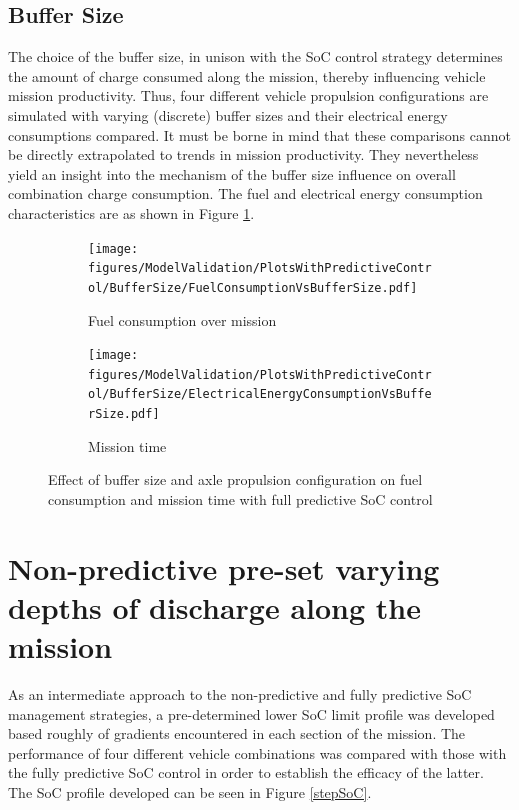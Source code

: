 \documentclass[ExampleMasters.tex]{subfiles}
\begin{document}
\subsection{Buffer Size}
The choice of the buffer size, in unison with the SoC control strategy determines the amount of charge consumed along the mission, thereby influencing vehicle mission productivity. Thus, four different vehicle propulsion configurations are simulated with varying (discrete) buffer sizes and their electrical energy consumptions compared. It must be borne in mind that these comparisons cannot be directly extrapolated to trends in mission productivity. They nevertheless yield an insight into the mechanism of the buffer size influence on overall combination charge consumption. The fuel and electrical energy consumption characteristics are as shown in Figure \ref{fuelElectricalEnergyBufferSizePredictiveSoC}.\\

\begin{figure}[h!]
\begin{subfigure}{.5\textwidth}
	\centering
	\texttt{[image: figures/ModelValidation/PlotsWithPredictiveControl/BufferSize/FuelConsumptionVsBufferSize.pdf]}
	\caption{Fuel consumption over mission}
\end{subfigure}
\begin{subfigure}{.5\textwidth}
	\centering
	\texttt{[image: figures/ModelValidation/PlotsWithPredictiveControl/BufferSize/ElectricalEnergyConsumptionVsBufferSize.pdf]}
	\caption{Mission time}
\end{subfigure}
\caption{Effect of buffer size and axle propulsion configuration on fuel consumption and mission time with full predictive SoC control}
\label{fuelElectricalEnergyBufferSizePredictiveSoC}
\end{figure}


\section{Non-predictive pre-set varying depths of discharge along the mission}

As an intermediate approach to the non-predictive and fully predictive SoC management strategies, a pre-determined lower SoC limit profile was developed based roughly of gradients encountered in each section of the mission. The performance of four different vehicle combinations was compared with those with the fully predictive SoC control in order to establish the efficacy of the latter. The SoC profile developed can be seen in Figure \ref{stepSoC}.\\
\end{document}

